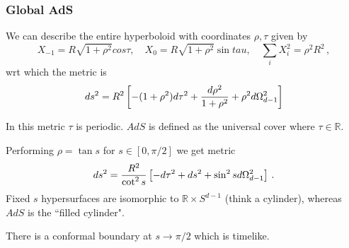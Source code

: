 \documentclass{article}
\begin{document}
\subsubsection{Global AdS}
We can describe the entire hyperboloid with coordinates $\rho, \tau$ given by 
\[
X_{-1} = R \sqrt{1+\rho^2} cos \tau, \quad X_0 = R \sqrt{1+\rho^2}\sin tau, \quad \sum_i X_i^2 = \rho^2 R^2 \, , 
\]
wrt which the metric is 
\[
ds^2 = R^2 \left[ -(1+\rho^2) d\tau^2 + \frac{d\rho^2}{1+\rho^2} + \rho^2 d \Omega_{d-1}^2 \right]
\]
\begin{remark}
	In this metric $\tau$ is periodic. $AdS$ is defined as the universal cover where $\tau \in \mathbb{R}$. 
\end{remark}
Performing $\rho = \tan s$ for $s\in [0, \pi/2]$ we get metric 
\[
ds^2 = \frac{R^2}{\cot^2 s} \left[ -d\tau^2 + ds^2  + \sin^2 s d\Omega_{d-1}^2 \right] \, .
\]
Fixed $s$ hypersurfaces are isomorphic to $\mathbb{R} \times S^{d-1}$ (think a cylinder), whereas $AdS$ is the ``filled cylinder". 
\begin{remark}
	There is a conformal boundary at $ s \to \pi/2$ which is timelike. 
\end{remark}
\end{document}
